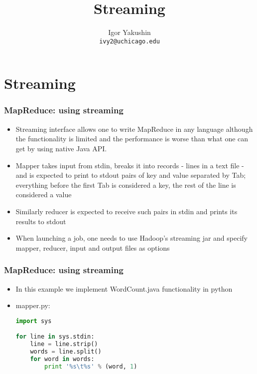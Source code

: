\documentclass{beamer}
\title{\huge{Streaming}}
\author{Igor Yakushin \\ \texttt{ivy2@uchicago.edu}}
\date{}
\begin{document}



\begin{frame}
\titlepage
\end{frame}


  
\section{Streaming}
  \begin{frame}[fragile]
 \frametitle{MapReduce: using streaming}
 \begin{itemize}
 \item Streaming interface allows one to write MapReduce in any language although the functionality is limited and the performance is worse than what one can
 get by using native Java API. 
\item Mapper takes input from stdin, breaks it into records - lines in a text file - and is expected to print to stdout pairs of key and value separated by Tab;
  everything before the first Tab is considered a key, the rest of the line is considered a value
 \item Similarly reducer is expected to receive such pairs in stdin and prints its results to stdout
 \item When launching a job, one needs to use Hadoop's streaming jar and specify mapper, reducer, input and output files as options

 \end{itemize}
\end{frame}

  
\begin{frame}[fragile]
 \frametitle{MapReduce: using streaming}

 \begin{itemize}
   \item In this example we implement {\color{mycolorcli}WordCount.java} functionality in python
   \item {\color{mycolorcli}mapper.py}:
{\color{mycolorcode}
  \begin{lstlisting}[frame=single, basicstyle=\tiny,language=python]
import sys

for line in sys.stdin:
    line = line.strip()
    words = line.split()
    for word in words:
        print '%s\t%s' % (word, 1)

 \end{lstlisting} 
}
 \end{itemize}

\end{frame}
\end{document}
